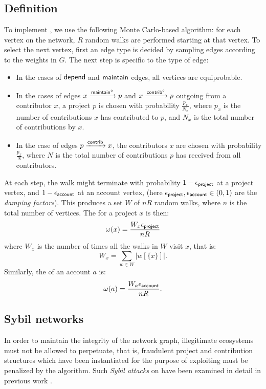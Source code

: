 \subsection{Definition}

To implement \osrank{}, we use the following Monte Carlo-based algorithm: for
each vertex on the network, $R$ random walks are performed starting at that
vertex. To select the next vertex, first an edge type is decided
by sampling edges according to the weights in $G$. The next step is specific to
the type of edge:

\begin{itemize}
\item In the cases of $\mathsf{depend}$ and $\mathsf{maintain}$ edges, all vertices are equiprobable.
\item In the cases of edges $x \xrightarrow[]{\mathsf{maintain}^\circ} p$ and
  $x \xrightarrow[]{\mathsf{contrib}^\circ} p$ outgoing from a contributor $x$, a project $p$ is
  chosen with probability $\frac{p_x}{N_x}$, where $p_x$ is the number of
  contributions $x$ has contributed to $p$, and $N_x$ is the total number of
  contributions by $x$.
\item In the case of edges $p \xrightarrow[]{\mathsf{contrib}} x$, the contributors $x$ are
  chosen with probability $\frac{p_x}{N}$, where $N$ is the total number of
  contributions $p$ has received from all contributors.
\end{itemize}

\noindent At each step, the walk might terminate with probability $1 - \epsilon_{\mathsf{project}}$ at a
project vertex, and $1 - \epsilon_{\mathsf{account}}$ at an account vertex, (here
$\epsilon_{\mathsf{project}}, \epsilon_{\mathsf{account}} \in (0,1)$ are the \emph{damping factors}). This
produces a set $W$ of $nR$ random walks, where $n$ is the total number of
vertices. The \osrank{} for a project $x$ is then:
\[
  \omega(x) = \frac{W_x \epsilon_{\mathsf{project}}}{n R}
\]
where $W_x$ is the number of times all the walks in $W$ visit $x$, that is:
\[
  W_x = \sum_{w \in W} |w[\{x\}]|.
\]
Similarly, the \osrank{} of an account $a$ is:
\[
  \omega(a) = \frac{W_a \epsilon_{\mathsf{account}}}{n R}.
\]

\subsection{Sybil networks}

In order to maintain the integrity of the \oscoin{} network graph, illegitimate
ecosystems must not be allowed to perpetuate, that is, fraudulent project and
contribution structures which have been instantiated for the purpose of
exploiting \osrank{} must be penalized by the algorithm.  Such \emph{Sybil attacks}
on \pagerank{} have been examined in detail in previous work
\cite{pagerank-sybil}.

